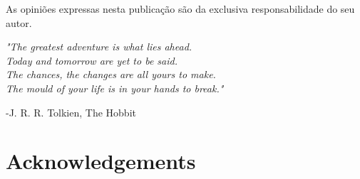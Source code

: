 \documentclass[12pt,a4paper,twoside,openright]{book}
\def\blankpage{%
      \clearpage%
      \thispagestyle{empty}%
      \null%
      \clearpage}
\begin{document}
\begin{sloppy}
\frontmatter


\clearpage \thispagestyle{empty}\mbox{}\clearpage


\clearpage \thispagestyle{empty}\mbox{}\clearpage

\newpage
\thispagestyle{empty}
\vspace*{\fill}
As opiniões expressas nesta publicação são da exclusiva responsabilidade do seu autor.
\blankpage

\newpage
\thispagestyle{empty}
\vspace*{3cm}
\begin{center}
\emph{"The greatest adventure is what lies ahead.\\
Today and tomorrow are yet to be said.\\
The chances, the changes are all yours to make.\\
The mould of your life is in your hands to break."} \\
\end{center} 
\begin{flushright}-J. R. R. Tolkien, The Hobbit\end{flushright}
\clearpage \thispagestyle{empty}\mbox{}\clearpage


\newpage
\thispagestyle{plain}
\chapter*{Acknowledgements}

\clearpage \thispagestyle{empty}\mbox{}\clearpage

\newpage
\thispagestyle{plain}

\end{sloppy}
\end{document}
